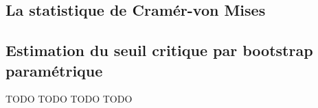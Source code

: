 \subsection{La statistique de Cramér-von Mises}

\subsection{Estimation du seuil critique par bootstrap paramétrique}





TODO   TODO   TODO   TODO






